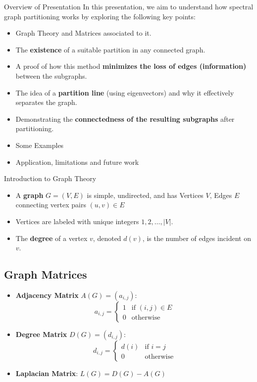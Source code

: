 \documentclass[aspectratio=169]{beamer}
\begin{document}
\begin{frame}{Overview of Presentation}
In this presentation, we aim to understand how spectral graph partitioning works by exploring the following key points:
\begin{itemize}
    \item Graph Theory and Matrices associated to it.
    \item The \textbf{existence} of a suitable partition in any connected graph.
    \item A proof of how this method \textbf{minimizes the loss of edges (information)} between the subgraphs.
    \item The idea of a \textbf{partition line} (using eigenvectors) and why it effectively separates the graph.
    \item Demonstrating the \textbf{connectedness of the resulting subgraphs} after partitioning. 
    \item Some Examples
    \item Application, limitations and future work
\end{itemize}
\end{frame}



\begin{frame}{Introduction to Graph Theory}


\begin{itemize}
    \item A \textbf{graph} \( G = (V, E) \) is simple, undirected, and has Vertices \( V \), Edges \( E \) connecting vertex pairs \( (u,v) \in E \)
    \item Vertices are labeled with unique integers \( 1, 2, \ldots, |V| \).
    \item The \textbf{degree} of a vertex \( v \), denoted \( d(v) \), is the number of edges incident on \( v \).
\end{itemize}

\subsection*{Graph Matrices}

\begin{itemize}
    \item \textbf{Adjacency Matrix} \( A(G) = (a_{i,j}) \):
    \[
    a_{i,j} = 
    \begin{cases}
        1 & \text{if } (i, j) \in E \\
        0 & \text{otherwise}
    \end{cases}
    \]

    \item \textbf{Degree Matrix} \( D(G) = (d_{i,j}) \):
    \[
    d_{i,j} = 
    \begin{cases}
        d(i) & \text{if } i = j \\
        0 & \text{otherwise}
    \end{cases}
    \]

    \item \textbf{Laplacian Matrix}:
    \(
    L(G) = D(G) - A(G)
    \)
\end{itemize}
\end{frame}
\end{document}

